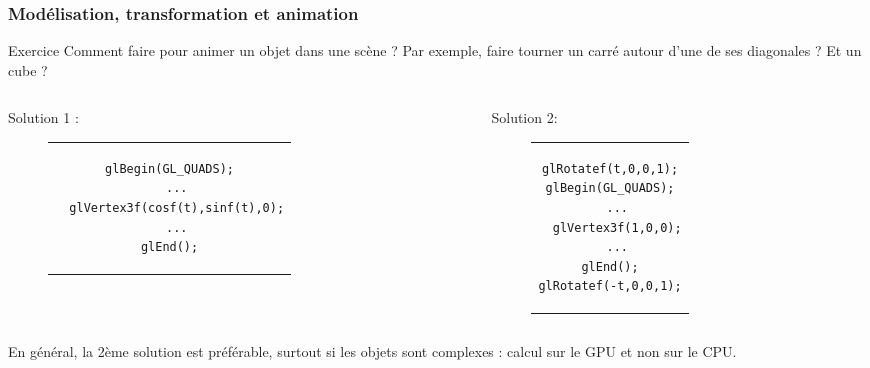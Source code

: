 \documentclass{beamer}
\begin{document}
\begin{frame}[fragile]
\frametitle{Modélisation, transformation et animation}
	\begin{exampleblock}{Exercice}
		Comment faire pour animer un objet dans une scène ? Par exemple, faire tourner un carré autour d'une de ses diagonales ? Et un cube ?
	\end{exampleblock}
	\pause
	\begin{columns}[T]
		\begin{column}{0.58\textwidth}
			\begin{block}{Solution 1 :}
				\begin{figure}[h]
				\centering
				\begin{tabular}{c}
				\begin{lstlisting}[basicstyle=\small]
glBegin(GL_QUADS);
  ...
  glVertex3f(cosf(t),sinf(t),0);
  ...
glEnd();
				\end{lstlisting}
				\end{tabular}
				\end{figure}
			\end{block}
		\end{column}
		\begin{column}{0.40\textwidth}
			\begin{block}{Solution 2:}
				\begin{figure}[h]
				\centering
				\begin{tabular}{c}
				\begin{lstlisting}[basicstyle=\small]
glRotatef(t,0,0,1);
glBegin(GL_QUADS);
  ...
  glVertex3f(1,0,0);
  ...
glEnd();
glRotatef(-t,0,0,1);
				\end{lstlisting}
				\end{tabular}
				\end{figure}
			\end{block}
		\end{column}
	\end{columns}
	\begin{block}{}
		En général, la 2ème solution est préférable, surtout si les objets sont complexes : calcul sur le GPU et non sur le CPU.
	\end{block}
\end{frame}
\end{document}
